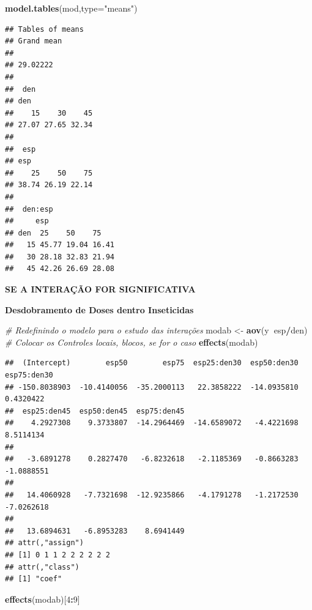 \documentclass[
]{book}
\newenvironment{Shaded}{\begin{snugshade}}{\end{snugshade}}
\newcommand{\CommentTok}[1]{\textcolor[rgb]{0.56,0.35,0.01}{\textit{#1}}}
\newcommand{\DataTypeTok}[1]{\textcolor[rgb]{0.13,0.29,0.53}{#1}}
\newcommand{\DecValTok}[1]{\textcolor[rgb]{0.00,0.00,0.81}{#1}}
\newcommand{\KeywordTok}[1]{\textcolor[rgb]{0.13,0.29,0.53}{\textbf{#1}}}
\newcommand{\NormalTok}[1]{#1}
\newcommand{\OperatorTok}[1]{\textcolor[rgb]{0.81,0.36,0.00}{\textbf{#1}}}
\newcommand{\StringTok}[1]{\textcolor[rgb]{0.31,0.60,0.02}{#1}}
\begin{document}
\begin{Shaded}
\begin{Highlighting}[]
\KeywordTok{model.tables}\NormalTok{(mod,}\DataTypeTok{type=}\StringTok{"means"}\NormalTok{)}
\end{Highlighting}
\end{Shaded}

\begin{verbatim}
## Tables of means
## Grand mean
##          
## 29.02222 
## 
##  den 
## den
##    15    30    45 
## 27.07 27.65 32.34 
## 
##  esp 
## esp
##    25    50    75 
## 38.74 26.19 22.14 
## 
##  den:esp 
##     esp
## den  25    50    75   
##   15 45.77 19.04 16.41
##   30 28.18 32.83 21.94
##   45 42.26 26.69 28.08
\end{verbatim}

\textbf{SE A INTERAÇÃO FOR SIGNIFICATIVA}

\textbf{Desdobramento de Doses dentro Inseticidas}

\begin{Shaded}
\begin{Highlighting}[]
\CommentTok{# Redefinindo o modelo para o estudo das interações}
\NormalTok{modab <-}\StringTok{ }\KeywordTok{aov}\NormalTok{(y}\OperatorTok{~}\NormalTok{esp}\OperatorTok{/}\NormalTok{den) }\CommentTok{# Colocar os Controles locais, blocos, se for o caso}
\KeywordTok{effects}\NormalTok{(modab)}
\end{Highlighting}
\end{Shaded}

\begin{verbatim}
##  (Intercept)        esp50        esp75  esp25:den30  esp50:den30  esp75:den30 
## -150.8038903  -10.4140056  -35.2000113   22.3858222  -14.0935810    0.4320422 
##  esp25:den45  esp50:den45  esp75:den45                                        
##    4.2927308    9.3733807  -14.2964469  -14.6589072   -4.4221698    8.5114134 
##                                                                               
##   -3.6891278    0.2827470   -6.8232618   -2.1185369   -0.8663283   -1.0888551 
##                                                                               
##   14.4060928   -7.7321698  -12.9235866   -4.1791278   -1.2172530   -7.0262618 
##                                        
##   13.6894631   -6.8953283    8.6941449 
## attr(,"assign")
## [1] 0 1 1 2 2 2 2 2 2
## attr(,"class")
## [1] "coef"
\end{verbatim}

\begin{Shaded}
\begin{Highlighting}[]
\KeywordTok{effects}\NormalTok{(modab)[}\DecValTok{4}\OperatorTok{:}\DecValTok{9}\NormalTok{]}
\end{Highlighting}
\end{Shaded}
\end{document}
